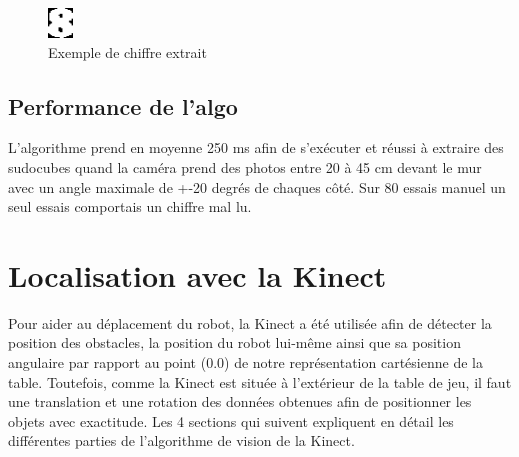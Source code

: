 \begin{figure}[h!]
\centering
\includegraphics[scale=1]{fig/8Extrait.png}
\caption{Exemple de chiffre extrait}
\label{fig:chiffre_extrait}
\end{figure}

\subsection{Performance de l'algo}
L'algorithme prend en moyenne 250 ms afin de s'exécuter et réussi à extraire des sudocubes quand la caméra prend des photos entre 20 à 45 cm devant le mur avec un angle maximale de +-20 degrés de chaques côté. Sur 80 essais manuel un seul essais comportais un chiffre mal lu.

\section{Localisation avec la Kinect}

Pour aider au déplacement du robot, la Kinect a été utilisée afin de détecter la position des obstacles, la position du robot lui-même ainsi que sa position angulaire par rapport au point (0.0) de notre représentation cartésienne de la table. Toutefois, comme la Kinect est située à l'extérieur de la table de jeu, il faut une translation et une rotation des données obtenues afin de positionner les objets avec exactitude. Les 4 sections qui suivent expliquent en détail les différentes parties de l'algorithme de vision de la Kinect.

